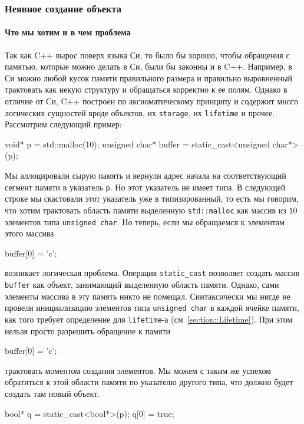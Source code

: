 \documentclass{article}
\begin{document}
\subsubsection{Неявное создание объекта}

\paragraph{Что мы хотим и в чем проблема}

Так как C++ вырос поверх языка Си, то было бы хорошо, чтобы обращения с памятью, которые можно делать в Си, были бы законны и в C++.
Например, в Си можно любой кусок памяти правильного размера и правильно выровненный трактовать как некую структуру и обращаться корректно к ее полям.
Однако в отличие от Си, C++ построен по аксиоматическому принципу и содержит много логических сущностей вроде объектов, их \verb"storage", их \verb"lifetime" и прочее.
Рассмотрим следующий пример:
\begin{cppcode}[numbers = none]
void* p = std::malloc(10);
unsigned char* buffer = static_cast<unsigned char*>(p);
\end{cppcode}
Мы аллоцировали сырую память и вернули адрес начала на соответствующий сегмент памяти в указатель \verb"p".
Но этот указатель не имеет типа.
В следующей строке мы скастовали этот указатель уже в типизированный, то есть мы говорим, что хотим трактовать область памяти выделенную \verb"std::malloc" как массив из $10$ элементов типа \verb"unsigned char".
Но теперь, если мы обращаемся к элементам этого массива
\begin{cppcode}[numbers = none]
buffer[0] = 'c';
\end{cppcode}
возникает логическая проблема.
Операция \verb"static_cast" позволяет создать массив \verb"buffer" как объект, занимающий выделенную область памяти.
Однако, сами элементы массива в эту память никто не помещал.
Синтаксически мы нигде не провели инициализацию элементов типа \verb"unsigned char" в каждой ячейке памяти, как того требует определение для \verb"lifetime"-а (см~\ref{section::Lifetime}).
При этом нельзя просто разрешить обращение к памяти
\begin{cppcode}[numbers = none]
buffer[0] = 'c';
\end{cppcode}
трактовать моментом создания элементов.
Мы можем с таким же успехом обратиться к этой области памяти по указателю другого типа, что должно будет создать там новый объект.
\begin{cppcode}[numbers = none]
bool* q = static_cast<bool*>(p);
q[0] = true;
\end{cppcode}
\end{document}
